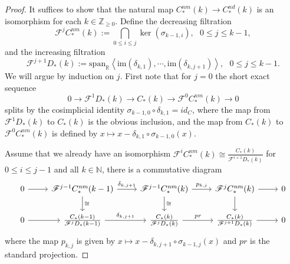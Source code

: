 \documentclass[10pt,a4paper]{amsart}
\begin{document}
\begin{proof}
It suffices to show that the natural map $C_\ast^\mathit{nm}(k)\rightarrow C_\ast^\mathit{nd}(k)$ is an isomorphism for each $k\in\mathbb{Z}_{\geq0}$. Define the decreasing filtration
\begin{equation}
\mathscr{F}^jC_\ast^\mathit{nm}(k):=\bigcap_{0\leq i\leq j}\ker(\sigma_{k-1,i}),\textrm{ }0\leq j\leq k-1,
\end{equation}
and the increasing filtration
\begin{equation}
\mathscr{F}^{j+1}D_\ast(k):=\mathrm{span}_\mathbb{R}\left\langle\mathrm{im}(\delta_{k,1}),\cdots,\mathrm{im}(\delta_{k,j+1})\right\rangle,\textrm{ }0\leq j\leq k-1.
\end{equation}
We will argue by induction on $j$. First note that for $j=0$ the short exact sequence
\begin{equation}
0\rightarrow\mathscr{F}^1D_\ast(k)\rightarrow C_\ast(k)\rightarrow\mathscr{F}^0C_\ast^\mathit{nm}(k)\rightarrow0
\end{equation}
splits by the cosimplicial identity $\sigma_{k-1,0}\circ\delta_{k,1}=\mathit{id}_C$, where the map from $\mathscr{F}^1D_\ast(k)$ to $C_\ast(k)$ is the obvious inclusion, and the map from $C_\ast(k)$ to $\mathscr{F}^0C_\ast^\mathit{nm}(k)$ is defined by $x\mapsto x-\delta_{k,1}\circ\sigma_{k-1,0}(x)$.

Assume that we already have an isomorphism $\mathscr{F}^iC_\ast^\mathit{nm}(k)\cong\frac{C_\ast(k)}{\mathscr{F}^{i+1}D_\ast(k)}$ for $0\leq i\leq j-1$ and all $k\in\mathbb{N}$, there is a commutative diagram
\begin{equation}\label{eq:diagram}
\begin{tikzcd}
	0 \arrow[r] &\mathscr{F}^{j-1}C_\ast^\mathit{nm}(k-1) \arrow[d,"\cong"] \arrow[r,"\delta_{k,j+1}"] &\mathscr{F}^{j-1}C_\ast^\mathit{nm}(k) \arrow[d, "\cong"] \arrow[r,"p_{k,j}"] &\mathscr{F}^jC_\ast^\mathit{nm}(k) \arrow[d] \arrow[r] &0 \\
	0 \arrow[r] &\frac{C_\ast(k-1)}{\mathscr{F}^{j}D_\ast(k-1)} \arrow[r, "\delta_{k,j+1}"] &\frac{C_\ast(k)}{\mathscr{F}^{j}D_\ast(k)} \arrow[r,"\mathit{pr}"] &\frac{C_\ast(k)}{\mathscr{F}^{j+1}D_\ast(k)} \arrow[r] &0
\end{tikzcd}
\end{equation}
where the map $p_{k,j}$ is given by $x\mapsto x-\delta_{k,j+1}\circ\sigma_{k-1,j}(x)$ and $\mathit{pr}$ is the standard projection. 


\end{proof}
\end{document}
